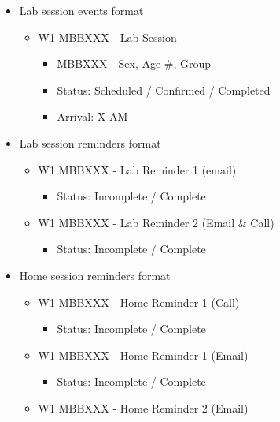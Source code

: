 \documentclass[
]{book}
\providecommand{\tightlist}{%
  \setlength{\itemsep}{0pt}\setlength{\parskip}{0pt}}
\begin{document}
\begin{itemize}
\tightlist
\item
  Lab session events format

  \begin{itemize}
  \tightlist
  \item
    W1 MBBXXX - Lab Session

    \begin{itemize}
    \tightlist
    \item
      MBBXXX - Sex, Age \#, Group
    \item
      Status: Scheduled / Confirmed / Completed
    \item
      Arrival: X AM
    \end{itemize}
  \end{itemize}
\item
  Lab session reminders format

  \begin{itemize}
  \tightlist
  \item
    W1 MBBXXX - Lab Reminder 1 (email)

    \begin{itemize}
    \tightlist
    \item
      Status: Incomplete / Complete
    \end{itemize}
  \item
    W1 MBBXXX - Lab Reminder 2 (Email \& Call)

    \begin{itemize}
    \tightlist
    \item
      Status: Incomplete / Complete
    \end{itemize}
  \end{itemize}
\item
  Home session reminders format

  \begin{itemize}
  \tightlist
  \item
    W1 MBBXXX - Home Reminder 1 (Call)

    \begin{itemize}
    \tightlist
    \item
      Status: Incomplete / Complete
    \end{itemize}
  \item
    W1 MBBXXX - Home Reminder 1 (Email)

    \begin{itemize}
    \tightlist
    \item
      Status: Incomplete / Complete
    \end{itemize}
  \item
    W1 MBBXXX - Home Reminder 2 (Email)


\end{itemize}
\end{itemize}
\end{document}

